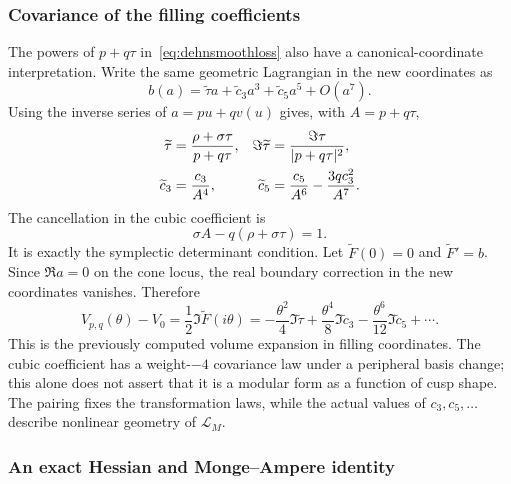 \subsubsection{Covariance of the filling coefficients}

The powers of $p+q\tau$ in~\eqref{eq:dehnsmoothloss} also have
a canonical-coordinate interpretation. Write the same geometric
Lagrangian in the new coordinates as
\[
 b(a)=\widetilde\tau a+\widetilde c_3a^3
                         +\widetilde c_5a^5+O(a^7).
\]
Using the inverse series of $a=pu+qv(u)$ gives, with $A=p+q\tau$,
\begin{align}
 \widetilde\tau&=\frac{\rho+\sigma\tau}{p+q\tau},
 &\Im\widetilde\tau&=\frac{\Im\tau}{|p+q\tau|^2},\notag\\
 \widetilde c_3&=\frac{c_3}{A^4},
 &\widetilde c_5&=\frac{c_5}{A^6}-\frac{3qc_3^2}{A^7}.
 \label{eq:NZcoefficientcovariance}
\end{align}
The cancellation in the cubic coefficient is
\[
 \sigma A-q(\rho+\sigma\tau)=1.
\]
It is exactly the symplectic determinant condition. Let
$\widetilde F(0)=0$ and $\widetilde F'=b$.
Since $\Re a=0$ on the cone locus, the real boundary correction
in the new coordinates vanishes. Therefore
\begin{equation}
 V_{p,q}(\theta)-V_0
  =\frac12\Im\widetilde F(i\theta)
  =-\frac{\theta^2}{4}\Im\widetilde\tau
    +\frac{\theta^4}{8}\Im\widetilde c_3
    -\frac{\theta^6}{12}\Im\widetilde c_5+\cdots.
 \label{eq:NZvolumenewpolarization}
\end{equation}
This is the previously computed volume expansion in filling
coordinates. The cubic coefficient has a weight-$-4$ covariance
law under a peripheral basis change; this alone does not assert
that it is a modular form as a function of cusp shape.
The pairing fixes the transformation laws, while the actual values
of $c_3,c_5,\ldots$ describe nonlinear geometry of $\mathcal L_M$.

\subsubsection{An exact Hessian and Monge--Ampere identity}

